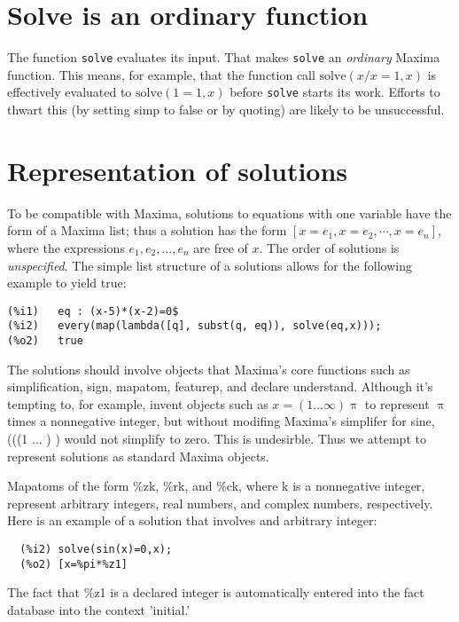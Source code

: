 \documentclass[]{scrartcl}
\newcommand{\solve}{\texttt{solve}}
\begin{document}
\section{Solve is an ordinary function}

The function \solve \/ evaluates its input. That makes \solve \/ an \emph{ordinary} Maxima function. This means, for example, that the function call \(\mathrm{solve}(x/x=1,x)\) is effectively evaluated to
\(\mathrm{solve}(1=1,x)\) before \solve \/ starts its work. Efforts to thwart this (by setting simp to
false or by quoting) are likely to be unsuccessful.

\section{Representation of solutions}

To be compatible with Maxima, solutions to equations with one variable have the form of a Maxima list; thus a solution has the form \([x = e_1, x = e_2, \cdots, x = e_n]\), where the expressions \(e_1, e_2, \dots, e_n\) are free of \(x\). The order of solutions is \emph{unspecified}. The simple list structure of a solutions allows for the following example to yield true:

\begin{verbatim}
(%i1)	eq : (x-5)*(x-2)=0$
(%i2)	every(map(lambda([q], subst(q, eq)), solve(eq,x)));
(%o2)	true
\end{verbatim}

The solutions should involve objects that Maxima's core functions such as simplification, sign, mapatom, featurep, and declare understand. Although it's tempting to, for example, invent objects such as
\(x = (1 ... \infty) \uppi\) to represent \(\uppi\) times a nonnegative integer, but without modifing
Maxima's simplifer for sine, (\sin \left ((1 ... \infty) \uppi \right) \) would not simplify to zero. This is undesirble. Thus we attempt to represent solutions as standard Maxima objects.

Mapatoms of the form \%zk, \%rk, and \%ck, where k is a nonnegative integer, represent arbitrary integers, real numbers, and complex numbers, respectively. Here is an example of a solution that involves and arbitrary integer:
\begin{verbatim}
  (%i2)	solve(sin(x)=0,x);
  (%o2)	[x=%pi*%z1]
\end{verbatim}
The fact that \%z1 is a declared integer is automatically entered into the fact database into the context 'initial.'
\end{document}
